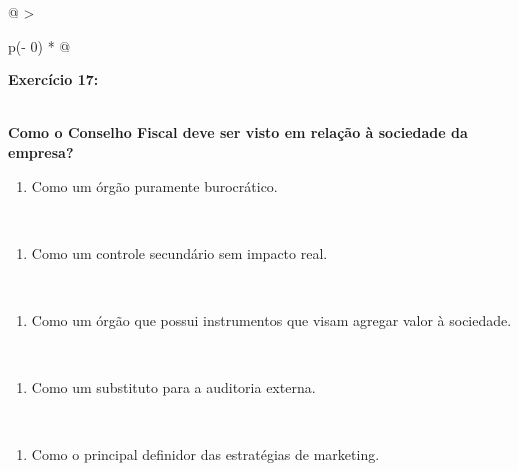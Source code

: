 \documentclass[
]{book}
\providecommand{\tightlist}{%
  \setlength{\itemsep}{0pt}\setlength{\parskip}{0pt}}
\begin{document}
\begin{longtable}[]{@{}
  >{\raggedright\arraybackslash}p{(\columnwidth - 0\tabcolsep) * }@{}}
\toprule\noalign{}
\begin{minipage}[b]{\linewidth}\raggedright
\textbf{Exercício 17:}
\end{minipage} \\
\midrule\noalign{}
\endhead
\bottomrule\noalign{}
\endlastfoot
\textbf{Como o Conselho Fiscal deve ser visto em relação à sociedade da empresa?} \\
\begin{minipage}[t]{\linewidth}\raggedright
\begin{enumerate}
\def\labelenumi{\alph{enumi})}
\tightlist
\item
  Como um órgão puramente burocrático.
\end{enumerate}
\end{minipage} \\
\begin{minipage}[t]{\linewidth}\raggedright
\begin{enumerate}
\def\labelenumi{\alph{enumi})}
\setcounter{enumi}{1}
\tightlist
\item
  Como um controle secundário sem impacto real.
\end{enumerate}
\end{minipage} \\
\begin{minipage}[t]{\linewidth}\raggedright
\begin{enumerate}
\def\labelenumi{\alph{enumi})}
\setcounter{enumi}{2}
\tightlist
\item
  Como um órgão que possui instrumentos que visam agregar valor à sociedade.
\end{enumerate}
\end{minipage} \\
\begin{minipage}[t]{\linewidth}\raggedright
\begin{enumerate}
\def\labelenumi{\alph{enumi})}
\setcounter{enumi}{3}
\tightlist
\item
  Como um substituto para a auditoria externa.
\end{enumerate}
\end{minipage} \\
\begin{minipage}[t]{\linewidth}\raggedright
\begin{enumerate}
\def\labelenumi{\alph{enumi})}
\setcounter{enumi}{4}
\tightlist
\item
  Como o principal definidor das estratégias de marketing.
\end{enumerate}
\end{minipage} \\
\end{longtable}
\end{document}
